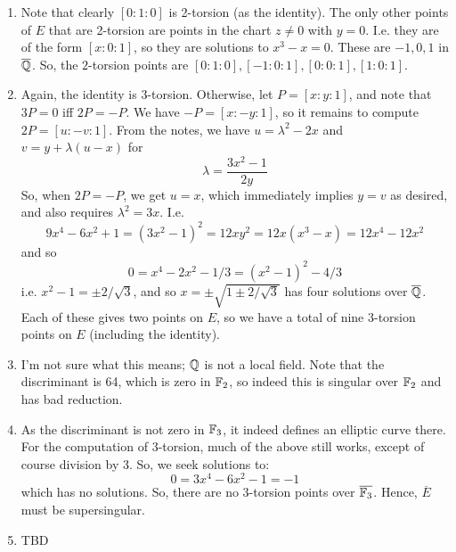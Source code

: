 \documentclass{article}
\begin{document}
\begin{enumerate}
	\item Note that clearly $[0:1:0]$ is 2-torsion (as the identity). The only other points of $E$ that are 2-torsion are points in the chart $z \neq 0$ with $y = 0$. I.e. they are of the form $[x:0:1]$, so they are solutions to $x^3-x=0$. These are $-1,0,1$ in $\overline{\mathbb{Q}}$. So, the $2$-torsion points are $[0:1:0],[-1:0:1],[0:0:1],[1:0:1]$.
	
	\item Again, the identity is $3$-torsion. Otherwise, let $P = [x:y:1]$, and note that $3P = 0$ iff $2P=-P$. We have $-P = [x:-y:1]$, so it remains to compute $2P=[u:-v:1]$. From the notes, we have $u = \lambda^2-2x$ and $v=y+\lambda(u-x)$ for
	\[ \lambda = \frac{3x^2-1}{2y} \]
	So, when $2P=-P$, we get $u=x$, which immediately implies $y=v$ as desired, and also requires $\lambda^2 = 3x$. I.e.
	\[ 9x^4 - 6x^2 + 1 = (3x^2-1)^2 = 12xy^2 = 12x(x^3-x) = 12x^4 - 12x^2 \]
	and so
	\[ 0 = x^4 - 2x^2 - 1/3 = (x^2 - 1)^2 - 4/3 \]
	i.e. $x^2 - 1 = \pm 2/\sqrt{3}$, and so $x = \pm \sqrt{1 \pm 2/\sqrt{3}}$ has four solutions over $\overline{\mathbb{Q}}$. Each of these gives two points on $E$, so we have a total of nine 3-torsion points on $E$ (including the identity).
	
	\item I'm not sure what this means; $\mathbb{Q}$ is not a local field. Note that the discriminant is 64, which is zero in $\mathbb{F}_2$, so indeed this is singular over $\mathbb{F}_2$ and has bad reduction.
	
	\item As the discriminant is not zero in $\mathbb{F}_3$, it indeed defines an elliptic curve there. For the computation of 3-torsion, much of the above still works, except of course division by 3. So, we seek solutions to:
	\[ 0 = 3x^4 - 6x^2 - 1 = -1 \]
	which has no solutions. So, there are no 3-torsion points over $\overline{\mathbb{F}_3}$. Hence, $\overline{E}$ must be supersingular.
	
	\item TBD
\end{enumerate}
\end{document}
